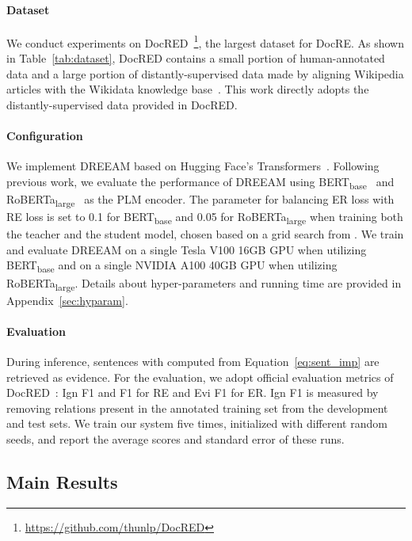 \documentclass[11pt]{article}
\begin{document}
\paragraph{Dataset}  We conduct experiments on DocRED~\cite{yao-etal-2019-docred}\footnote{\url{https://github.com/thunlp/DocRED}}, the largest dataset for DocRE.
As shown in Table~\ref{tab:dataset}, DocRED contains a small portion of human-annotated data and a large portion of distantly-supervised data made by aligning Wikipedia articles with the Wikidata knowledge base~\cite{wikidata}.
This work directly adopts the distantly-supervised data provided in DocRED.

\paragraph{Configuration} We implement DREEAM based on Hugging Face's Transformers~\cite{wolf-etal-2020-transformers}.
Following previous work, we evaluate the performance of DREEAM using BERT\textsubscript{base}~\cite{devlin-etal-2019-bert} and RoBERTa\textsubscript{large}~\cite{Liu2019RoBERTaAR} as the PLM encoder.
The parameter for balancing ER loss with RE loss is set to 0.1 for BERT\textsubscript{base} and 0.05 for RoBERTa\textsubscript{large} when training both the teacher and the student model, chosen based on a grid search from .
We train and evaluate DREEAM on a single Tesla V100 16GB GPU when utilizing BERT\textsubscript{base} and on a single NVIDIA A100 40GB GPU when utilizing RoBERTa\textsubscript{large}.
Details about hyper-parameters and running time are provided in Appendix~\ref{sec:hyparam}.

\paragraph{Evaluation} During inference, sentences  with  computed from Equation~\ref{eq:sent_imp} are retrieved as evidence.
For the evaluation, we adopt official evaluation metrics of DocRED~\cite{yao-etal-2019-docred}: Ign F1 and F1 for RE and Evi F1 for ER.
Ign F1 is measured by removing relations present in the annotated training set from the development and test sets.
We train our system five times, initialized with different random seeds, and report the average scores and standard error of these runs.

\subsection{Main Results}
\label{sec:main_results}
\end{document}
